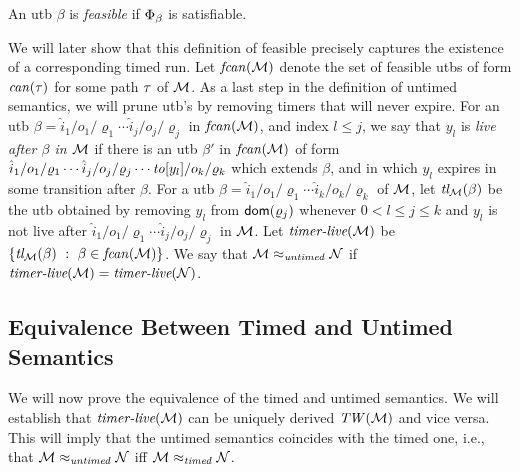 \begin{definition}
  \label{def:feasible}
  An utb $\beta$ is \emph{feasible} if $\Phi_{\beta}$ is satisfiable.
\end{definition}
We will later show that this definition of feasible precisely captures
the existence of a corresponding timed run.
Let $\mathit{fcan}({{\mathcal M}})$ denote the set of feasible utbs of form $\mathit{can}({\tau})$ for some
path $\tau$ of ${\mathcal M}$.
As a last step in the definition of untimed semantics, we will
prune utb's by removing timers that will never expire.
For an utb
$\beta  =  {\hat{i}_1/o_1/\varrho_1}  \cdots {\hat{i}_j/o_j/\varrho_j}$ in $\mathit{fcan}({{\mathcal M}})$,
and index $l \leq j$,
we say that $y_l$ is \emph{live after $\beta$ in ${\mathcal M}$}
if there is an utb $\beta'$ in $\mathit{fcan}({{\mathcal M}})$ of form
${\hat{i}_1/o_1/\varrho_1}  \cdots {\hat{i}_j/o_j/\varrho_j} \cdots {\mathit{to}[y_l]/o_k/\varrho_k}$ which extends $\beta$, and in which 
$y_l$ expires in some transition after $\beta$.
For a utb $\beta  =  {\hat{i}_1/o_1/\varrho_1}  \cdots {\hat{i}_k/o_k/\varrho_k}$ of ${\mathcal M}$,
let $\mbox{\it tl}_{{\mathcal M}}({\beta})$ be the utb obtained by removing 
$y_l$ from ${\textsf{dom}}(\varrho_j)$ whenever $0 < l \leq j \leq k$ and
$y_l$ is not live after ${\hat{i}_1/o_1/\varrho_1}  \cdots {\hat{i}_j/o_j/\varrho_j}$ in ${\mathcal M}$.
Let
$\mbox{\it timer-live}({{\mathcal M}})$ be $\lbrace \mbox{\it tl}_{{\mathcal M}}({\beta}) ~:~ \beta \in \mathit{fcan}({{\mathcal M}})\rbrace$.
We say that ${\mathcal M} \approx_{\mathit{untimed}} {\mathcal N}$ if
$\mbox{\it timer-live}({{\mathcal M}}) = \mbox{\it timer-live}({{\mathcal N}})$.

\subsection{Equivalence Between Timed and Untimed Semantics}

We will now prove the equivalence of the timed and untimed semantics.
We will establish that $\mbox{\it timer-live}({{\mathcal M}})$ can
be uniquely derived $\mathit{TW}({\mathcal M})$ and vice versa.
This will imply that the untimed semantics coincides with the timed
one, i.e., that
\(
{\mathcal M} \approx_{\mathit{untimed}} {\mathcal N}
\)
iff
\(
{\mathcal M} \approx_{\mathit{timed}} {\mathcal N}
\).

